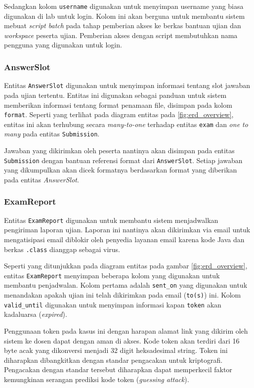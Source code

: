     Sedangkan kolom \texttt{username} digunakan untuk menyimpan username yang
    biasa digunakan di lab untuk login. Kolom ini akan berguna untuk membantu
    sistem mebuat \textit{script batch} pada tahap pemberian akses ke berkas
    bantuan ujian dan \textit{workspace} peserta ujian. Pemberian akses dengan
    script membutuhkan nama pengguna yang digunakan untuk login.
    
\subsubsection{AnswerSlot}
    Entitas \texttt{AnswerSlot} digunakan untuk menyimpan informasi tentang slot
    jawaban pada ujian tertentu. Entitas ini digunakan sebagai panduan untuk
    sistem memberikan informasi tentang format penamaan file, disimpan pada
    kolom \texttt{format}. Seperti yang terlihat pada diagram entitas pada
    \ref{fig:erd_overview}, entitas ini akan terhubung secara
    \textit{many-to-one} terhadap entitas \texttt{exam} dan \textit{one to many}
    pada entitas \texttt{Submission}.
    
    Jawaban yang dikirimkan oleh peserta nantinya akan disimpan pada entitas
    \texttt{Submission} dengan bantuan referensi format dari
    \texttt{AnswerSlot}. Setiap jawaban yang dikumpulkan akan dicek formatnya
    berdasarkan format yang diberikan pada entitas \textit{AnswerSlot}.

\subsubsection{ExamReport}
    Entitas \texttt{ExamReport} digunakan untuk membantu sistem menjadwalkan
    pengiriman laporan ujian. Laporan ini nantinya akan dikirimkan via email
    untuk mengatisipasi email diblokir oleh penyedia layanan email karena kode
    Java dan berkas \texttt{.class} dianggap sebagai virus.
    
    Seperti yang ditunjukkan pada diagram entitas pada gambar
    \ref{fig:erd_overview}, entitas \texttt{ExamReport} menyimpan beberapa kolom
    yang digunakan untuk membantu penjadwalan. Kolom pertama adalah
    \texttt{sent\_on} yang digunakan untuk menandakan apakah ujian ini telah
    dikirimkan pada email (\texttt{to(s)}) ini. Kolom \texttt{valid\_until}
    digunakan untuk menyimpan informasi kapan \texttt{token} akan kadaluarsa
    (\textit{expired}).
    
    Penggunaan token pada kasus ini dengan harapan alamat link yang dikirim oleh
    sistem ke dosen dapat dengan aman di akses. Kode token akan terdiri dari 16
    byte acak yang dikonversi menjadi 32 digit heksadesimal string. Token ini
    diharapkan dibangkitkan dengan standar pengacakan untuk kriptografi.
    Pengacakan dengan standar tersebut diharapkan dapat memperkecil faktor
    kemungkinan serangan prediksi kode token (\textit{guessing attack}).

